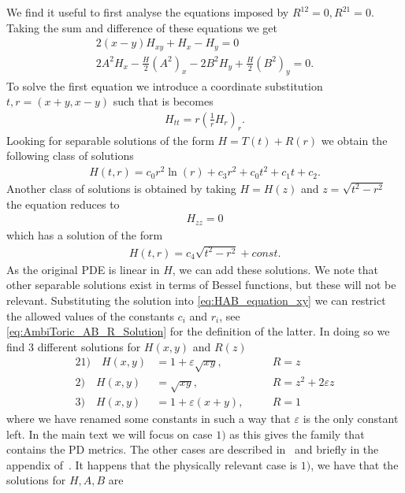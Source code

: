 \documentclass[10pt]{report}
\theoremstyle{definition}
\begin{document}
We find it useful to first analyse the equations imposed by $R^{12} = 0, R^{21}=0$. Taking the sum and difference of these equations we get
\begin{align}
    2(x-y)H_{xy} + H_x - H_y = 0 \label{eq:H_equation_xy} \\
    2A^2 H_x - \frac{H}{2}(A^2)_x -2B^2 H_y + \frac{H}{2}(B^2)_y = 0. \label{eq:HAB_equation_xy}
\end{align}
To solve the first equation we introduce a coordinate substitution $t,r = (x+y,x-y)$ such that is becomes 
\begin{align}
    H_{tt} = r\left( \frac{1}{r}H_r \right)_r.
\end{align}
Looking for separable solutions of the form $H = T(t) + R(r)$ we obtain the following class of solutions
\begin{align}
    H(t,r) = c_0 r^2 \ln(r) + c_3 r^2 + c_0 t^2  + c_1 t + c_2.
\end{align}
Another class of solutions is obtained by taking $H = H(z)$ and $z = \sqrt{t^2-r^2}$ the equation reduces to 
\begin{align}
    H_{zz} = 0
\end{align}
which has a solution of the form 
\begin{align}
    H(t,r) = c_4 \sqrt{t^2-r^2} + const.
\end{align}
As the original PDE is linear in $H$, we can add these solutions.
We note that other separable solutions exist in terms of Bessel functions, but these will not be relevant.
Substituting the solution into \cref{eq:HAB_equation_xy} we can restrict the allowed values of the constants $c_i$ and $r_i$, see \cref{eq:AmbiToric_AB_R_Solution} for the definition of the latter. In doing so we find 3 different solutions for $H(x,y)$ and $R(z)$
\begin{alignat}{2}
    1) \quad H(x,y) &= 1 + \varepsilon \sqrt{xy}, \quad &&R = z \nonumber\\
    2) \quad H(x,y) &= \sqrt{xy}, \quad &&R = z^2 + 2\varepsilon z \label{eq:HR_solutions_cases} \\
    3) \quad H(x,y) &= 1 + \varepsilon (x+y), \quad &&R = 1 \nonumber
\end{alignat}
where we have renamed some constants in such a way that $\varepsilon$ is the only constant left. In the main text we will focus on case $1)$ as this gives the family that contains the PD metrics. The other cases are described in~\cite{AmbitoricGeomeAposto2013} and briefly in the appendix of~\cite{Kerr_metric_fro_Krasno_2024}. It happens that the physically relevant case is $1)$, we have that the solutions for $H,A,B$ are
\end{document}
